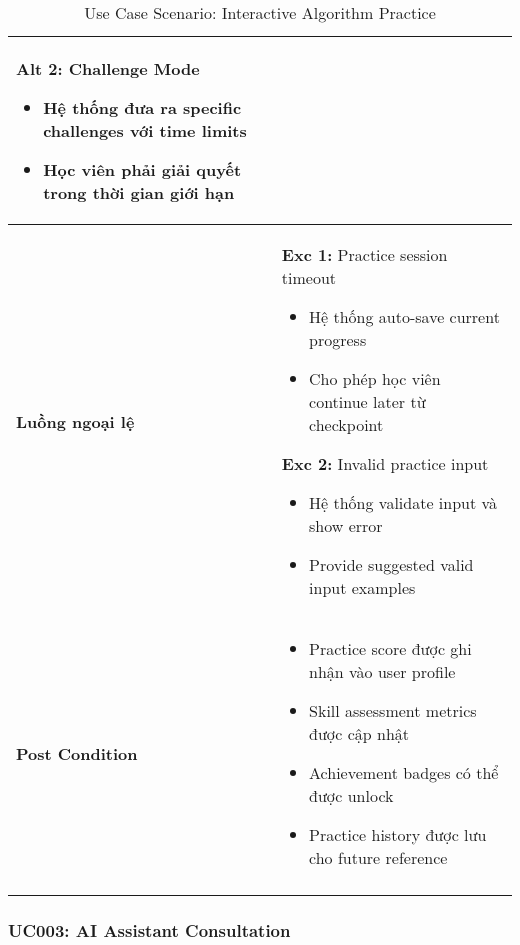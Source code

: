 \begin{longtable}{| p{3cm} | p{10cm} |}
\textbf{Alt 2:} Challenge Mode
\begin{itemize}
    \item Hệ thống đưa ra specific challenges với time limits
    \item Học viên phải giải quyết trong thời gian giới hạn
\end{itemize} \\ \hline
\textbf{Luồng ngoại lệ} & 
\textbf{Exc 1:} Practice session timeout
\begin{itemize}
    \item Hệ thống auto-save current progress
    \item Cho phép học viên continue later từ checkpoint
\end{itemize}
\textbf{Exc 2:} Invalid practice input
\begin{itemize}
    \item Hệ thống validate input và show error
    \item Provide suggested valid input examples
\end{itemize} \\ \hline
\textbf{Post Condition} & 
\begin{itemize}
    \item Practice score được ghi nhận vào user profile
    \item Skill assessment metrics được cập nhật
    \item Achievement badges có thể được unlock
    \item Practice history được lưu cho future reference
\end{itemize} \\ \hline
\caption{Use Case Scenario: Interactive Algorithm Practice}
\label{tab:uc002} \\
\end{longtable}

\subsubsection{UC003: AI Assistant Consultation}

